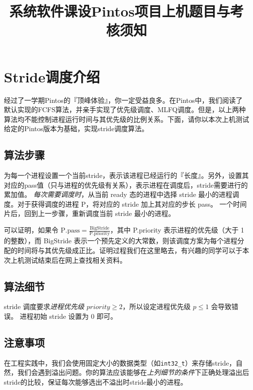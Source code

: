 \documentclass{ctexart}
\title{系统软件课设Pintos项目上机题目与考核须知}
\begin{document}
\maketitle

\section{Stride调度介绍}

经过了一学期Pintos的『顶峰体验』，你一定受益良多。在Pintos中，我们阅读了默认实现的FCFS算法，并亲手实现了优先级调度、MLFQ调度。但是，以上两种算法均不能控制进程运行时间与其优先级的比例关系。下面，请你以本次上机测试给定的Pintos版本为基础，实现stride调度算法。


\subsection{算法步骤}
\begin{outline}[enumerate]
    \1 为每一个进程设置一个当前stride，表示该进程已经运行的『长度』。另外，设置其对应的pass值（只与进程的优先级有关系），表示进程在调度后，stride需要进行的累加值。
    \1 \emph{每次需要调度时}，从当前 ready 态的进程中选择 stride 最小的进程调度。对于获得调度的进程 P，将对应的 stride 加上其对应的步长 pass。
    \1 一个时间片后，回到上一步骤，重新调度当前 stride 最小的进程。
\end{outline}

可以证明，如果令 $\mathrm{P.{pass} = \frac{BigStride}{P.{priority}}}$，其中 P.priority 表示进程的优先级（大于 1 的整数），而 BigStride 表示一个预先定义的大常数，则该调度方案为每个进程分配的时间将与其优先级成正比。证明过程我们在这里略去，有兴趣的同学可以于本次上机测试结束后在网上查找相关资料。

\subsection{算法细节}
\begin{outline}
    \1 stride 调度要求\emph{进程优先级 $priority \ge 2$}，所以设定进程优先级 $p \le 1$ 会导致错误。
    \1 进程初始 stride 设置为 0 即可。
\end{outline}

\subsection{注意事项}
在工程实践中，我们会使用固定大小的数据类型（如\texttt{int32\_t}）来存储stride，自然，我们会遇到溢出问题。你的算法应该能够在\emph{上列细节的条件}下正确处理溢出后stride的比较，保证每次能够选出不溢出时stride最小的进程。
\end{document}
